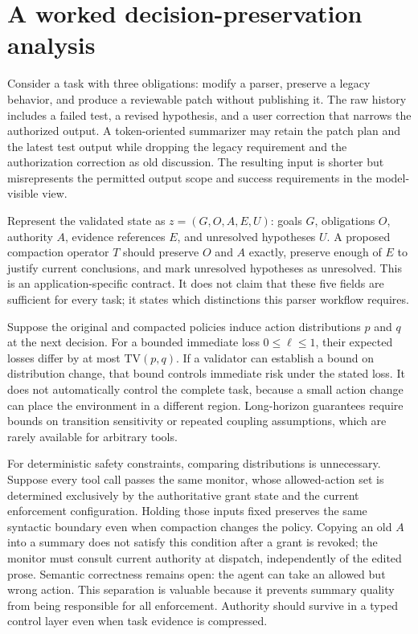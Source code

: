 \section{A worked decision-preservation analysis}\label{sec:C12:worked}
Consider a task with three obligations: modify a parser, preserve a legacy behavior, and produce a reviewable patch without publishing it. The raw history includes a failed test, a revised hypothesis, and a user correction that narrows the authorized output. A token-oriented summarizer may retain the patch plan and the latest test output while dropping the legacy requirement and the authorization correction as old discussion. The resulting input is shorter but misrepresents the permitted output scope and success requirements in the model-visible view.

Represent the validated state as $z=(G,O,A,E,U)$: goals $G$, obligations $O$, authority $A$, evidence references $E$, and unresolved hypotheses $U$. A proposed compaction operator $T$ should preserve $O$ and $A$ exactly, preserve enough of $E$ to justify current conclusions, and mark unresolved hypotheses as unresolved. This is an application-specific contract. It does not claim that these five fields are sufficient for every task; it states which distinctions this parser workflow requires.

Suppose the original and compacted policies induce action distributions $p$ and $q$ at the next decision. For a bounded immediate loss $0\leq\ell\leq1$, their expected losses differ by at most $\mathrm{TV}(p,q)$. If a validator can establish a bound on distribution change, that bound controls immediate risk under the stated loss. It does not automatically control the complete task, because a small action change can place the environment in a different region. Long-horizon guarantees require bounds on transition sensitivity or repeated coupling assumptions, which are rarely available for arbitrary tools.

For deterministic safety constraints, comparing distributions is unnecessary. Suppose every tool call passes the same monitor, whose allowed-action set is determined exclusively by the authoritative grant state and the current enforcement configuration. Holding those inputs fixed preserves the same syntactic boundary even when compaction changes the policy. Copying an old $A$ into a summary does not satisfy this condition after a grant is revoked; the monitor must consult current authority at dispatch, independently of the edited prose. Semantic correctness remains open: the agent can take an allowed but wrong action. This separation is valuable because it prevents summary quality from being responsible for all enforcement. Authority should survive in a typed control layer even when task evidence is compressed.

